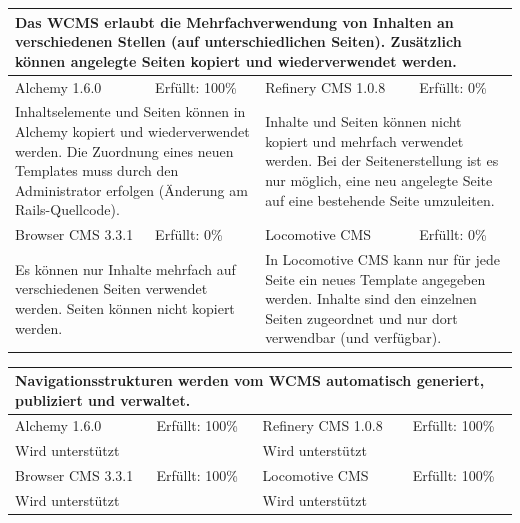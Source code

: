 \begin{tabular}[!ht]{|l|l|l|l|}
\hline
\multicolumn{4}{|p{15cm}|}{\textbf{Das WCMS erlaubt die Mehrfachverwendung von Inhalten an verschiedenen Stellen (auf unterschiedlichen Seiten). Zusätzlich können angelegte Seiten kopiert und wiederverwendet werden.}} \\
\hline
  Alchemy 1.6.0 & \cellcolor{green}Erfüllt: 100\% & Refinery CMS 1.0.8 & \cellcolor{red}Erfüllt: 0\% \\
  \hline
  \multicolumn{2}{|p{7.5cm}|}{Inhaltselemente und Seiten können in Alchemy kopiert und wiederverwendet werden. Die Zuordnung eines neuen Templates muss durch den Administrator erfolgen (Änderung am Rails-Quellcode).} & \multicolumn{2}{p{7.5cm}|}{Inhalte und Seiten können nicht kopiert und mehrfach verwendet werden. Bei der Seitenerstellung ist es nur möglich, eine neu angelegte Seite auf eine bestehende Seite umzuleiten.} \\
  \hline
  Browser CMS 3.3.1 & \cellcolor{red}Erfüllt: 0\% & Locomotive CMS & \cellcolor{red}Erfüllt: 0\% \\
  \hline
  \multicolumn{2}{|p{7.5cm}|}{Es können nur Inhalte mehrfach auf verschiedenen Seiten verwendet werden. Seiten können nicht kopiert werden.} & \multicolumn{2}{p{7.5cm}|}{In Locomotive CMS kann nur für jede Seite ein neues Template angegeben werden. Inhalte sind den einzelnen Seiten zugeordnet und nur dort verwendbar (und verfügbar).} \\
\hline
\end{tabular}
\newline
\newline
\newline
\begin{tabular}[!ht]{|l|l|l|l|}
\hline
\multicolumn{4}{|p{15cm}|}{\textbf{Navigationsstrukturen werden vom WCMS automatisch generiert, publiziert und verwaltet.}} \\
\hline
  Alchemy 1.6.0 & \cellcolor{green}Erfüllt: 100\% & Refinery CMS 1.0.8 & \cellcolor{green}Erfüllt: 100\% \\
  \hline
  \multicolumn{2}{|p{7.5cm}|}{Wird unterstützt} & \multicolumn{2}{p{7.5cm}|}{Wird unterstützt} \\
  \hline
  Browser CMS 3.3.1 & \cellcolor{green}Erfüllt: 100\% & Locomotive CMS & \cellcolor{green}Erfüllt: 100\% \\
  \hline
  \multicolumn{2}{|p{7.5cm}|}{Wird unterstützt} & \multicolumn{2}{p{7.5cm}|}{Wird unterstützt} \\
\hline
\end{tabular}

